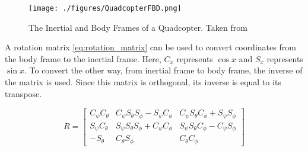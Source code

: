 \documentclass[letterpaper,12pt,titlepage,oneside,final]{book}
\begin{document}
\begin{figure}
\centering
\texttt{[image: ./figures/QuadcopterFBD.png]}
\caption{The Inertial and Body Frames of a Quadcopter. Taken from \cite{luukkonen2011modelling} } %
\label{fig:FBD}
\end{figure}

A rotation matrix \eqref{eq:rotation_matrix} can be used to convert coordinates from the body frame to the inertial frame.
Here, $C_{x}$ represents $\cos{x}$ and $S_{x}$ represents $\sin{x}$.
To convert the other way, from inertial frame to body frame, the inverse of the matrix is used. 
Since this matrix is orthogonal, its inverse is equal to its transpose.

\begin{equation} \label{eq:rotation_matrix}
R = 
\begin{bmatrix}
C_{\psi}C_{\theta} & C_{\psi}S_{\theta}S_{\phi} - S_{\psi}C_{\phi} & C_{\psi}S_{\theta}C_{\phi} + S_{\psi}S_{\phi} \\
S_{\psi}C_{\theta} & S_{\psi}S_{\theta}S_{\phi} + C_{\psi}C_{\phi} & S_{\psi}S_{\theta}C_{\phi} - C_{\psi}S_{\phi} \\
-S_{\theta} & C_{\theta}S_{\phi} & C_{\theta}C_{\phi}
\end{bmatrix}
\end{equation}


\end{document}

